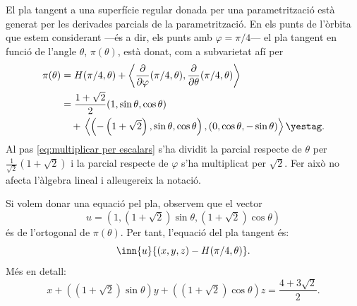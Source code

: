 El pla tangent a una superfície regular donada per una parametrització està generat per les derivades parcials de la parametrització. En els punts de l'òrbita que estem considerant ---és a dir, els punts amb \( \varphi = \pi/4 \)--- el pla tangent en funció de l'angle \( \theta \), \( \pi(\theta) \), està donat, com a subvarietat afí per
\begin{align*}
  \pi(\theta) &= H(\pi/4, \theta) + \left\langle \dfrac{\partial}{\partial \varphi}(\pi/4, \theta), \dfrac{\partial}{\partial \theta}(\pi/4, \theta) \right\rangle \\ 
							&= \dfrac{1+\sqrt{2}}{2} (1, \sin{\theta}, \cos{\theta}) \\
							& \quad +{} \left\langle \left(-\left(1+\sqrt{2}\right), \sin{\theta}, \cos{\theta}\right), (0, \cos{\theta}, -\sin{\theta}) \right\rangle \yestag \label{eq:multiplicar per escalars} .
\end{align*}
Al pas \ref{eq:multiplicar per escalars} s'ha dividit la parcial respecte de \( \theta \) per \( \frac{1}{\sqrt{2}}(1 + \sqrt{2}) \) i la parcial respecte de \( \varphi \) s'ha multiplicat per \( \sqrt{2} \). Fer això no afecta l'àlgebra lineal i alleugereix la notació.

Si volem donar una equació pel pla, observem que el vector \[ u = \left(1, \left(1+\sqrt{2}\right)\sin{\theta},  \left(1+\sqrt{2}\right)\cos{\theta}\right) \] és de l'ortogonal de \( \pi(\theta) \). Per tant, l'equació del pla tangent és:
\begin{equation*}
	\inn{u}{(x,y,z) - H(\pi/4, \theta)}.
\end{equation*}
Més en detall:
\begin{equation}
	x +\left(\left(1 + \sqrt{2}\right)\sin{\theta}\right)\! y +\left(\left(1 + \sqrt{2}\right)\cos{\theta}\right)\! z = \dfrac{4 + 3\sqrt{2}}{2}. 
\end{equation}



